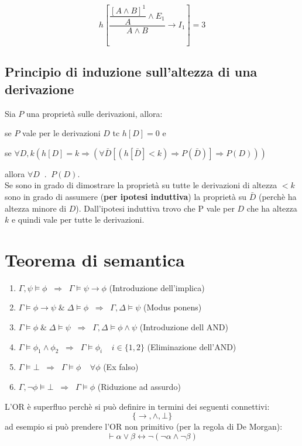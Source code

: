 \documentclass{article}
\theoremstyle{break}
\theoremstyle{break}
\theoremstyle{break}
\theoremstyle{break}
\begin{document}
\begin{exercise}
    \[
        h\left[ \dfrac{\dfrac{[A \wedge B]^1}{A}\wedge E_1}{A \wedge B} \to I_1 \right] = 3
    \] 
\end{exercise}

\subsection{Principio di induzione sull'altezza di una derivazione}
Sia \( P \) una proprietà sulle derivazioni, allora:

se \( P \) vale per le derivazioni \( D \) tc \( h[D]=0 \) e

se \( \forall D,k (h[D]=k \Rightarrow (\forall \bar{D}[(h[\bar{D}]<k) \Rightarrow P(\bar{D})] \Rightarrow P(D))) \)

allora \( \forall D\;\; . \;\; P(D) \).\\
Se sono in grado di dimostrare la proprietà su tutte le derivazioni di altezza \( <k \)
sono in grado di assumere (\textbf{per ipotesi induttiva}) la proprietà su \( \bar{D} \)
(perchè ha altezza minore di \( D \)). Dall'ipotesi induttiva trovo che P vale per
\( D \) che ha altezza \( k \) e quindi vale per tutte le derivazioni.


\section{Teorema di semantica}
    \begin{enumerate}
        \item \( \Gamma,\psi \models \phi\;\; \Rightarrow\;\; \Gamma \models \psi \to \phi \) (Introduzione dell'implica)
        \item \( \Gamma \models \phi \to \psi \;\&\; \Delta \models \phi \;\;\Rightarrow\;\; \Gamma,\Delta \models \psi \) (Modus ponens)
        \item \( \Gamma \models \phi \;\&\; \Delta \models \psi \;\;\Rightarrow\;\; \Gamma,\Delta \models \phi \wedge \psi \) (Introduzione dell AND)
        \item \( \Gamma \models \phi_1 \wedge \phi_2 \;\;\Rightarrow\;\; \Gamma \models \phi_i \;\;\;\; i \in \{1,2\}  \) (Eliminazione dell'AND)
        \item \( \Gamma \models \bot \;\;\Rightarrow\;\; \Gamma \models \phi \;\;\;\; \forall \phi \) (Ex falso)
        \item \( \Gamma, \neg \phi \models \bot \;\;\Rightarrow\;\; \Gamma \models \phi \) (Riduzione ad assurdo)
    \end{enumerate}
    L'OR è superfluo perchè si può definire in termini dei seguenti connettivi:
    \[
        \{\to , \wedge, \bot\} 
    \] 
    ad esempio si può prendere l'OR non primitivo (per la regola di De Morgan): \[ \vdash \alpha \vee \beta \leftrightarrow \neg(\neg \alpha \wedge \neg \beta) \] 
\end{document}
